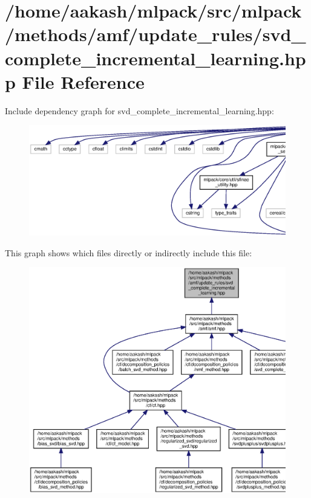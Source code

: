 \section{/home/aakash/mlpack/src/mlpack/methods/amf/update\+\_\+rules/svd\+\_\+complete\+\_\+incremental\+\_\+learning.hpp File Reference}
\label{svd__complete__incremental__learning_8hpp}
Include dependency graph for svd\+\_\+complete\+\_\+incremental\+\_\+learning.\+hpp\+:
\nopagebreak
\begin{figure}[H]
\begin{center}
\leavevmode
\includegraphics[width=350pt]{svd__complete__incremental__learning_8hpp__incl}
\end{center}
\end{figure}
This graph shows which files directly or indirectly include this file\+:
\nopagebreak
\begin{figure}[H]
\begin{center}
\leavevmode
\includegraphics[width=350pt]{svd__complete__incremental__learning_8hpp__dep__incl}
\end{center}
\end{figure}
